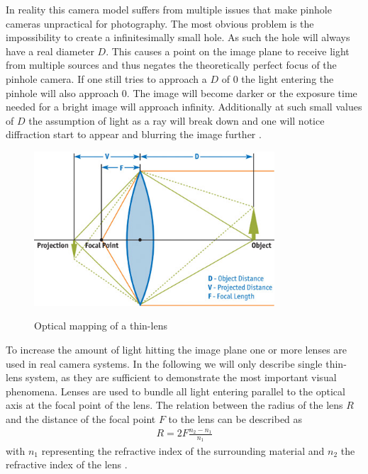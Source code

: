 In reality this camera model suffers from multiple issues that make pinhole cameras unpractical for photography.
The most obvious problem is the impossibility to create a infinitesimally small hole.
As such the hole will always have a real diameter $D$.
This causes a point on the image plane to receive light from multiple sources and thus negates the theoretically perfect focus of the pinhole camera.
If one still tries to approach a $D$ of $0$ the light entering the pinhole will also approach $0$.
The image will become darker or the exposure time needed for a bright image will approach infinity.
Additionally at such small values of $D$ the assumption of light as a ray will break down and one will notice diffraction start to appear and blurring the image further \cite{Beyerer.2016}.

\begin{figure}[h]
    \centering
    \includegraphics[width=0.8\textwidth]{images/fig23-01_1.png}
    \caption{Optical mapping of a thin-lens}
    \label{fig:thin-lens}
    \cite{Demers.2005}
\end{figure}

To increase the amount of light hitting the image plane one or more lenses are used in real camera systems.
In the following we will only describe single thin-lens system, as they are sufficient to demonstrate the most important visual phenomena.
Lenses are used to bundle all light entering parallel to the optical axis at the focal point of the lens.
The relation between the radius of the lens $R$ and the distance of the focal point $F$ to the lens can be described as
\begin{align}
    R = 2 F \frac{n_2 - n_1}{n_1}
\end{align}
with $n_1$ representing the refractive index of the surrounding material and $n_2$ the refractive index of the lens \cite{Beyerer.2016}.

